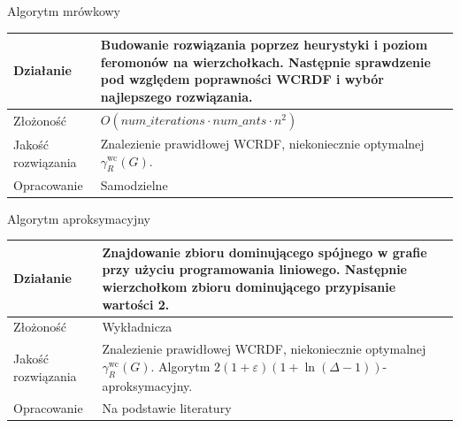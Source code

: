 \documentclass[polish,aspectratio=169]{beamer}
\begin{document}
\begin{frame}{Algorytm mrówkowy}
    \begin{table}
        \centering
        \begin{tabular}{|p{4cm}|p{10cm}|}
        \hline
        Działanie & Budowanie rozwiązania poprzez heurystyki i poziom feromonów na wierzchołkach. Następnie sprawdzenie pod względem poprawności WCRDF i wybór najlepszego rozwiązania.  \\
        \hline
        Złożoność & $O(num\_iterations \cdot num\_ants \cdot n^2)$  \\
        \hline
        Jakość rozwiązania & Znalezienie prawidłowej WCRDF, niekoniecznie optymalnej $\gamma^{\mathrm{wc}}_R(G)$.\\
        \hline
        Opracowanie & Samodzielne  \\
        \hline
        \end{tabular}
        \label{tab:mrowkowy}
    \end{table}
\end{frame}

\begin{frame}{Algorytm aproksymacyjny}
    \begin{table}
        \centering
        \begin{tabular}{|p{4cm}|p{10cm}|}
        \hline
        Działanie & Znajdowanie zbioru dominującego spójnego w grafie przy użyciu programowania liniowego. Następnie wierzchołkom zbioru dominującego przypisanie wartości 2.  \\
        \hline
        Złożoność & Wykładnicza  \\
        \hline
        Jakość rozwiązania & Znalezienie prawidłowej WCRDF, niekoniecznie optymalnej $\gamma^{\mathrm{wc}}_R(G)$. Algorytm $2(1 + \varepsilon)(1 + \ln(\Delta - 1))$-aproksymacyjny.\\
        \hline
        Opracowanie & Na podstawie literatury  \\
        \hline
        \end{tabular}
        \label{tab:aproksymacyjny}
    \end{table}
\end{frame}
\end{document}
